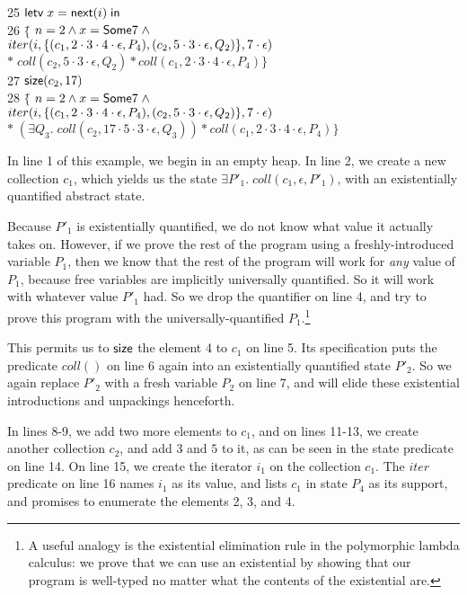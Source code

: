 \begin{tabbing}
25 \> $\mathsf{letv}\;x = \mathsf{next}(i)\;\mathsf{in}\;$ \\
26 \> $\{$\= $n = 2 \land x = \mathsf{Some }7 \;\land $\\
\> \> $iter(i, \{{(c_1, 2\cdot3\cdot4\cdot\epsilon, P_4), (c_2, 5\cdot3\cdot\epsilon, Q_2)}\}, 7\cdot\epsilon)$ \\
\> \> $*\; coll(c_2, 5\cdot3\cdot\epsilon, Q_2) * coll(c_1, 2\cdot3\cdot4\cdot\epsilon, P_4)\}$ \\
27 \> $\mathsf{size}(c_2, 17)$ \\
28 \> $\{$\= $n = 2 \land x = \mathsf{Some }7 \;\land $\\
\> \> $iter(i, \{{(c_1, 2\cdot3\cdot4\cdot\epsilon, P_4), (c_2, 5\cdot3\cdot\epsilon, Q_2)}\}, 7\cdot\epsilon)$ \\ 
\> \> $* \; (\exists Q_3.\; coll(c_2, 17\cdot5\cdot3\cdot\epsilon, Q_3)) * coll(c_1, 2\cdot3\cdot4\cdot\epsilon, P_4)\}$ \\
\end{tabbing}


In line 1 of this example, we begin in an empty heap. In line 2, we
create a new collection $c_1$, which yields us the state $\exists
P'_1.\; coll(c_1, \epsilon, P'_1)$, with an existentially quantified
abstract state.

Because $P'_1$ is existentially quantified, we do not know what value
it actually takes on. However, if we prove the rest of the program
using a freshly-introduced variable $P_1$, then we know that the rest
of the program will work for \emph{any} value of $P_1$, because free
variables are implicitly universally quantified.  So it will work with
whatever value $P'_1$ had. So we drop the quantifier on line 4, and
try to prove this program with the universally-quantified
$P_1$.\footnote{A useful analogy is the existential elimination rule
  in the polymorphic lambda calculus: we prove that we can use an
  existential by showing that our program is well-typed no matter what
  the contents of the existential are.}

This permits us to $\mathsf{size}$ the element 4 to $c_1$ on line 5. Its
specification puts the predicate $coll()$ on line 6 again into an
existentially quantified state $P'_2$. So we again replace $P'_2$ with
a fresh variable $P_2$ on line 7, and will elide these existential
introductions and unpackings henceforth.

In lines 8-9, we add two more elements to $c_1$, and on lines 11-13,
we create another collection $c_2$, and add $3$ and $5$ to it, as can
be seen in the state predicate on line 14. On line 15, we create the
iterator $i_1$ on the collection $c_1$. The $iter$ predicate on line
16 names $i_1$ as its value, and lists $c_1$ in state $P_4$ as its
support, and promises to enumerate the elements 2, 3, and 4.

